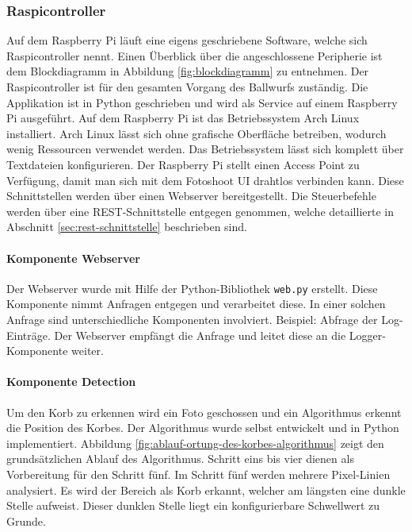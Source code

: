 \subsubsection{Raspicontroller}
Auf dem Raspberry Pi läuft eine eigens geschriebene Software, welche sich Raspicontroller nennt. Einen Überblick über die angeschlossene Peripherie ist dem Blockdiagramm in Abbildung \ref{fig:blockdiagramm} zu entnehmen. Der Raspicontroller ist für den gesamten Vorgang des Ballwurfs zuständig. Die Applikation ist in Python geschrieben und wird als Service auf einem Raspberry Pi ausgeführt. Auf dem Raspberry Pi ist das Betriebssystem Arch Linux installiert. Arch Linux lässt sich ohne grafische Oberfläche betreiben, wodurch wenig Ressourcen verwendet werden. Das Betriebssystem lässt sich komplett über Textdateien konfigurieren. Der Raspberry Pi stellt einen Access Point zu Verfügung, damit man sich mit dem Fotoshoot UI drahtlos verbinden kann. Diese Schnittstellen werden über einen Webserver bereitgestellt. Die Steuerbefehle werden über eine REST-Schnittstelle entgegen genommen, welche detaillierte in Abschnitt \ref{sec:rest-schnittstelle} beschrieben sind. 

\paragraph{Komponente Webserver}
Der Webserver wurde mit Hilfe der Python-Bibliothek \texttt{web.py} erstellt. Diese Komponente nimmt Anfragen entgegen und verarbeitet diese. In einer solchen Anfrage sind unterschiedliche Komponenten involviert. Beispiel: Abfrage der Log-Einträge. Der Webserver empfängt die Anfrage und leitet diese an die Logger-Komponente weiter.

\paragraph{Komponente Detection}
Um den Korb zu erkennen wird ein Foto geschossen und ein Algorithmus erkennt die Position des Korbes. Der Algorithmus wurde selbst entwickelt und in Python implementiert. Abbildung \ref{fig:ablauf-ortung-des-korbes-algorithmus} zeigt den grundsätzlichen Ablauf des Algorithmus. Schritt eins bis vier dienen als Vorbereitung für den Schritt fünf. Im Schritt fünf werden mehrere Pixel-Linien analysiert. Es wird der Bereich als Korb erkannt, welcher am längsten eine dunkle Stelle aufweist. Dieser dunklen Stelle liegt ein konfigurierbare Schwellwert zu Grunde.

